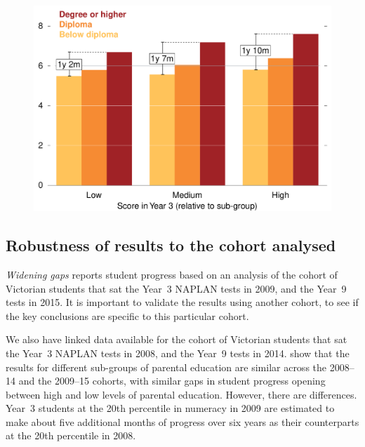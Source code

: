 \begin{figure}[H]
 \includegraphics[width=\columnwidth]{atlas/gaps_pc.pdf}\label{fig:gaps_pc}

\end{figure}

\newpage
\subsection{Robustness of results to the cohort analysed} \label{sec:cohort2}

\textit{Widening gaps} reports student progress based on an analysis of the cohort of Victorian students that sat the \mbox{Year 3} NAPLAN tests in 2009, and the \mbox{Year 9} tests in 2015. It is important to validate the results using another cohort, to see if the key conclusions are specific to this particular cohort.

We also have linked data available for the cohort of Victorian students that sat the \mbox{Year 3} NAPLAN tests in 2008, and the \mbox{Year 9} tests in 2014.  show that the results for different sub-groups of parental education are similar across the 2008--14 and the 2009--15 cohorts, with similar gaps in student progress opening between high and low levels of parental education. However, there are differences. \mbox{Year 3} students at the 20th percentile in numeracy in 2009 are estimated to make about five additional months of progress over six years as their counterparts at the 20th percentile in 2008.

